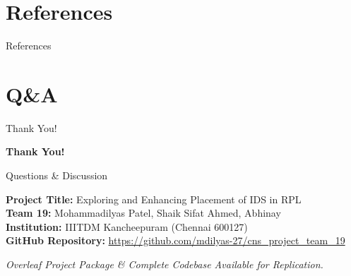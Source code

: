 \documentclass[aspectratio=169, 10pt]{beamer}
\begin{document}
\section{References}
\begin{frame}[allowframebreaks]{References}
  \footnotesize
  
  
\end{frame}

\section{Q\&A}
\begin{frame}{Thank You!}
  \begin{center}
    \vspace{0.8cm}
    {\Huge \textbf{\textcolor{navyblue}{Thank You!}}}
    
    \vspace{0.6cm}
    {\large Questions \& Discussion}
    
    \vspace{0.8cm}
    \begin{tcolorbox}[colback=blue!5!white, colframe=navyblue, width=0.85\textwidth, halign=center]
      \textbf{Project Title:} Exploring and Enhancing Placement of IDS in RPL \\
      \textbf{Team 19:} Mohammadilyas Patel, Shaik Sifat Ahmed, Abhinay \\
      \textbf{Institution:} IIITDM Kancheepuram (Chennai 600127) \\
      \textbf{GitHub Repository:} \url{https://github.com/mdilyas-27/cns_project_team_19}
    \end{tcolorbox}
    
    \vspace{0.4cm}
    \footnotesize
    \textit{Overleaf Project Package \& Complete Codebase Available for Replication.}
  \end{center}
\end{frame}
\end{document}
